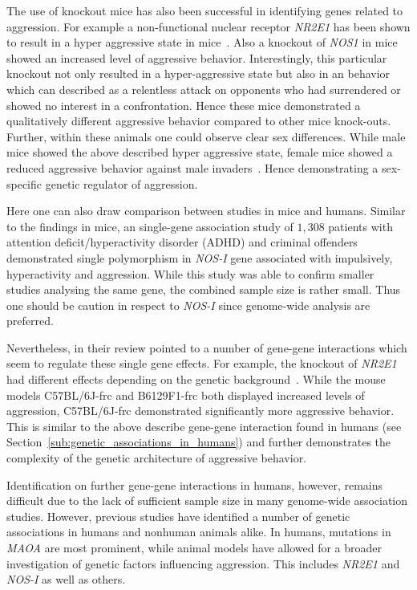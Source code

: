 The use of knockout mice has also been successful in identifying genes related to aggression.
For example a non-functional nuclear receptor \textit{NR2E1} has been shown to result in a hyper aggressive state in mice~\cite{Young2002}.
Also a knockout of \textit{NOS1} in mice showed an increased level of aggressive behavior.
Interestingly, this particular knockout not only resulted in a hyper-aggressive state but also in an behavior which can described as a relentless attack on opponents who had surrendered or showed no interest in a confrontation.
Hence these mice demonstrated a qualitatively different aggressive behavior compared to other mice knock-outs.
Further, within these animals one could observe clear sex differences.
While male mice showed the above described hyper aggressive state, female mice showed a reduced aggressive behavior against male invaders~\cite{Gammie1999,Nelson1995}.
Hence demonstrating a sex-specific genetic regulator of aggression.

Here one can also draw comparison between studies in mice and humans.
Similar to the findings in mice, an single-gene association study of $1,308$ patients with attention deficit/hyperactivity disorder (ADHD) and criminal offenders demonstrated single polymorphism in \textit{NOS-I} gene associated with impulsively, hyperactivity and aggression.
While this study was able to confirm smaller studies analysing the same gene, the combined sample size is rather small.
Thus one should be caution in respect to \textit{NOS-I} since genome-wide analysis are preferred.

Nevertheless, in their review \citet{Anholt2012} pointed to a number of gene-gene interactions which seem to regulate these single gene effects.
For example, the knockout of \textit{NR2E1} had different effects depending on the genetic background~\cite{Young2002}.
While the mouse models C57BL/6J-frc and B6129F1-frc both displayed increased levels of aggression, C57BL/6J-frc demonstrated significantly more aggressive behavior.
This is similar to the above describe gene-gene interaction found in humans (see Section~\ref{sub:genetic_associations_in_humans}) and further demonstrates the complexity of the genetic architecture of aggressive behavior.

Identification on further gene-gene interactions in humans, however, remains difficult due to the lack of sufficient sample size in many genome-wide association studies.
However, previous studies have identified a number of genetic associations in humans and nonhuman animals alike.
In humans, mutations in \textit{MAOA} are most prominent, while animal models have allowed for a broader investigation of genetic factors influencing aggression.
This includes \textit{NR2E1} and \textit{NOS-I} as well as others.

